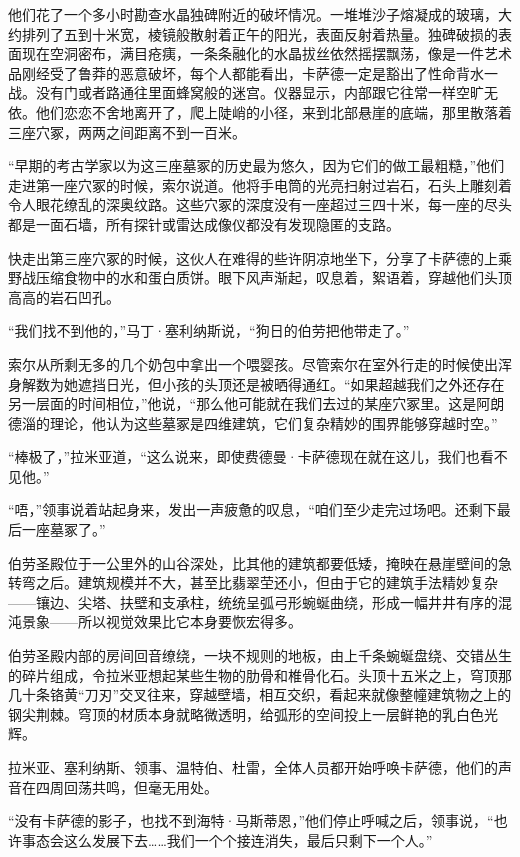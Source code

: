 \documentclass[AutoFakeBold=true]{book}
\begin{document}
他们花了一个多小时勘查水晶独碑附近的破坏情况。一堆堆沙子熔凝成的玻璃，大约排列了五到十米宽，棱镜般散射着正午的阳光，表面反射着热量。独碑破损的表面现在空洞密布，满目疮痍，一条条融化的水晶拔丝依然摇摆飘荡，像是一件艺术品刚经受了鲁莽的恶意破坏，每个人都能看出，卡萨德一定是豁出了性命背水一战。没有门或者路通往里面蜂窝般的迷宫。仪器显示，内部跟它往常一样空旷无依。他们恋恋不舍地离开了，爬上陡峭的小径，来到北部悬崖的底端，那里散落着三座穴冢，两两之间距离不到一百米。

``早期的考古学家以为这三座墓冢的历史最为悠久，因为它们的做工最粗糙，''他们走进第一座穴冢的时候，索尔说道。他将手电筒的光亮扫射过岩石，石头上雕刻着令人眼花缭乱的深奥纹路。这些穴冢的深度没有一座超过三四十米，每一座的尽头都是一面石墙，所有探针或雷达成像仪都没有发现隐匿的支路。

快走出第三座穴冢的时候，这伙人在难得的些许阴凉地坐下，分享了卡萨德的上乘野战压缩食物中的水和蛋白质饼。眼下风声渐起，叹息着，絮语着，穿越他们头顶高高的岩石凹孔。

``我们找不到他的，''马丁·塞利纳斯说，``狗日的伯劳把他带走了。''

索尔从所剩无多的几个奶包中拿出一个喂婴孩。尽管索尔在室外行走的时候使出浑身解数为她遮挡日光，但小孩的头顶还是被晒得通红。``如果超越我们之外还存在另一层面的时间相位，''他说，``那么他可能就在我们去过的某座穴冢里。这是阿朗德淄的理论，他认为这些墓冢是四维建筑，它们复杂精妙的围界能够穿越时空。''

``棒极了，''拉米亚道，``这么说来，即使费德曼·卡萨德现在就在这儿，我们也看不见他。''

``唔，''领事说着站起身来，发出一声疲惫的叹息，``咱们至少走完过场吧。还剩下最后一座墓冢了。''

伯劳圣殿位于一公里外的山谷深处，比其他的建筑都要低矮，掩映在悬崖壁间的急转弯之后。建筑规模并不大，甚至比翡翠茔还小，但由于它的建筑手法精妙复杂——镶边、尖塔、扶壁和支承柱，统统呈弧弓形蜿蜒曲绕，形成一幅井井有序的混沌景象——所以视觉效果比它本身要恢宏得多。

伯劳圣殿内部的房间回音缭绕，一块不规则的地板，由上千条蜿蜒盘绕、交错丛生的碎片组成，令拉米亚想起某些生物的肋骨和椎骨化石。头顶十五米之上，穹顶那几十条铬黄``刀刃''交叉往来，穿越壁墙，相互交织，看起来就像整幢建筑物之上的钢尖荆棘。穹顶的材质本身就略微透明，给弧形的空间投上一层鲜艳的乳白色光辉。

拉米亚、塞利纳斯、领事、温特伯、杜雷，全体人员都开始呼唤卡萨德，他们的声音在四周回荡共鸣，但毫无用处。

``没有卡萨德的影子，也找不到海特·马斯蒂恩，''他们停止呼喊之后，领事说，``也许事态会这么发展下去……我们一个个接连消失，最后只剩下一个人。''
\end{document}
